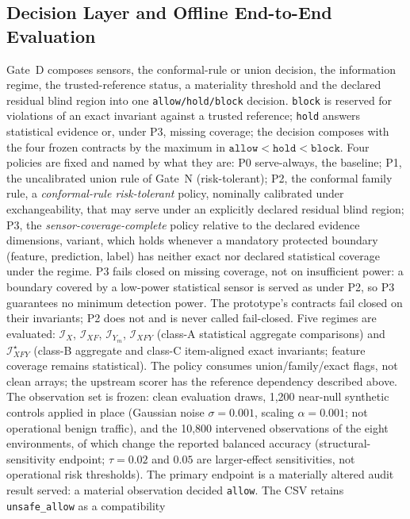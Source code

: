 \documentclass[10pt,journal,compsoc]{IEEEtran}
\newcommand{\IX}{\mathcal I_X}
\newcommand{\IXF}{\mathcal I_{XF}}
\newcommand{\IYm}{\mathcal I_{Y_m}}
\newcommand{\IXFY}{\mathcal I_{XFY}}
\newcommand{\IXFYs}{\mathcal I_{XFY}^{\star}}
\begin{document}
\subsection{Decision Layer and Offline End-to-End Evaluation}

Gate~D composes sensors, the conformal-rule or union decision, the information regime, the
trusted-reference status, a materiality threshold and the declared residual
blind region into one \texttt{allow/hold/block} decision. \texttt{block} is
reserved for violations of an exact invariant against a trusted reference;
\texttt{hold} answers statistical evidence or, under P3, missing coverage;
the decision composes with the four frozen contracts by the maximum in
$\texttt{allow}<\texttt{hold}<\texttt{block}$. Four policies are fixed and
named by what they are: P0 serve-always, the baseline; P1, the uncalibrated
union rule of Gate~N (risk-tolerant); P2, the conformal family rule, a
\emph{conformal-rule risk-tolerant} policy, nominally calibrated under
exchangeability, that may serve under an explicitly
declared residual blind region; P3, the \emph{sensor-coverage-complete}
policy relative to the declared evidence dimensions,
variant, which holds whenever a mandatory protected boundary (feature,
prediction, label) has neither exact nor declared statistical coverage under
the regime. P3 fails closed on missing coverage, not on insufficient power: a
boundary covered by a low-power statistical sensor is served as under P2, so
P3 guarantees no minimum detection power. The prototype's contracts fail
closed on their invariants; P2 does not and is never called fail-closed. Five
regimes are evaluated: $\IX$, $\IXF$, $\IYm$, $\IXFY$ (class-A statistical
aggregate comparisons) and $\IXFYs$ (class-B aggregate and class-C
item-aligned exact invariants; feature coverage remains statistical). The
policy consumes union/family/exact flags, not clean arrays; the upstream
scorer has the reference dependency described above. The observation set is
frozen: \NEvalDraws{} clean
evaluation draws, 1,200 near-null synthetic controls applied in place
(Gaussian noise $\sigma=0.001$, scaling $\alpha=0.001$; not operational
benign traffic), and the 10,800 intervened observations of the eight
environments, \NMaterial{} of which change the reported balanced accuracy
(structural-sensitivity endpoint; $\tau=0.02$ and $0.05$ are larger-effect
sensitivities, not operational risk thresholds). The primary endpoint is a
materially altered audit result served: a material observation decided
\texttt{allow}. The CSV retains \texttt{unsafe\_allow} as a compatibility
\end{document}
